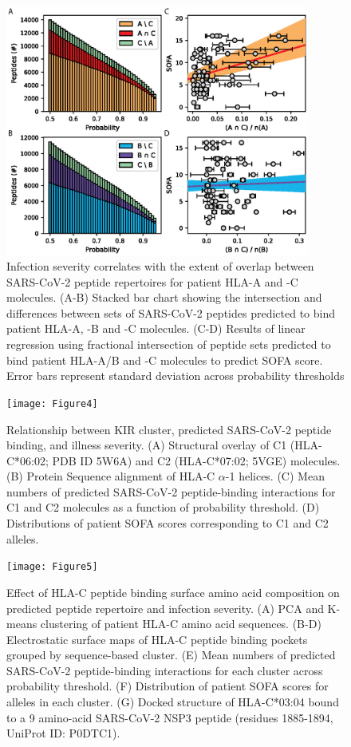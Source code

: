 \documentclass[utf8]{frontiersinFPHY_FAMS} %
\begin{document}
\begin{figure}[h!]
\begin{center}
\includegraphics[width=10cm]{Figure3}%
\end{center}
\caption{Infection severity correlates with the extent of overlap between SARS-CoV-2 peptide repertoires for patient HLA-A and -C molecules. (A-B) Stacked bar chart showing the intersection and differences between sets of SARS-CoV-2 peptides predicted to bind patient HLA-A, -B and -C molecules. (C-D) Results of linear regression using fractional intersection of peptide sets predicted to bind patient HLA-A/B and -C molecules to predict SOFA score. Error bars represent standard deviation across probability thresholds}\label{fig:3}
\end{figure}

\begin{figure}[h!]
\begin{center}
\texttt{[image: Figure4]}%
\end{center}
\caption{Relationship between KIR cluster, predicted SARS-CoV-2 peptide binding, and illness severity. (A) Structural overlay of C1 (HLA-C*06:02; PDB ID 5W6A) and C2 (HLA-C*07:02; 5VGE) molecules. (B) Protein Sequence alignment of HLA-C $\alpha$-1 helices. (C) Mean numbers of predicted SARS-CoV-2 peptide-binding interactions for C1 and C2 molecules as a function of probability threshold. (D) Distributions of patient SOFA scores corresponding to C1 and C2 alleles.}\label{fig:4}
\end{figure}

\begin{figure}[h!]
\begin{center}
\texttt{[image: Figure5]}%
\end{center}
\caption{Effect of HLA-C peptide binding surface amino acid composition on predicted peptide repertoire and infection severity. (A) PCA and K-means clustering of patient HLA-C amino acid sequences. (B-D) Electrostatic surface maps of HLA-C peptide binding pockets grouped by sequence-based cluster. (E) Mean numbers of predicted SARS-CoV-2 peptide-binding interactions for each cluster across probability threshold. (F) Distribution of patient SOFA scores for alleles in each cluster. (G) Docked structure of HLA-C*03:04 bound to a 9 amino-acid SARS-CoV-2 NSP3 peptide (residues 1885-1894, UniProt ID: P0DTC1).}\label{fig:5}
\end{figure}
\end{document}
